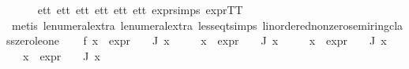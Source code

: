 \begin{isabellebody}
\ \ \ \ \isamarkupfalse%
\ e{}{\isacharunderscore}{\kern0pt}tt\ e{}{\isacharunderscore}{\kern0pt}tt\ e{}{\isacharunderscore}{\kern0pt}tt\ e{}{\isacharunderscore}{\kern0pt}tt\ e{}{\isacharunderscore}{\kern0pt}tt\ e{}{\isacharunderscore}{\kern0pt}tt\ expr{\isachardot}{\kern0pt}simps\ expr{\isacharunderscore}{\kern0pt}TT\ \isanewline
\ \ \ \ \isamarkupfalse%
\ {\isacharparenleft}{\kern0pt}metis\ le{\isacharunderscore}{\kern0pt}numeral{\isacharunderscore}{\kern0pt}extra{\isacharparenleft}{\kern0pt}{}{\isacharparenright}{\kern0pt}\ le{\isacharunderscore}{\kern0pt}numeral{\isacharunderscore}{\kern0pt}extra{\isacharparenleft}{\kern0pt}{}{\isacharparenright}{\kern0pt}\ less{\isacharunderscore}{\kern0pt}eq{\isacharunderscore}{\kern0pt}t{\isachardot}{\kern0pt}simps\ linordered{\isacharunderscore}{\kern0pt}nonzero{\isacharunderscore}{\kern0pt}semiring{\isacharunderscore}{\kern0pt}class{\isachardot}{\kern0pt}zero{\isacharunderscore}{\kern0pt}le{\isacharunderscore}{\kern0pt}one{\isacharparenright}{\kern0pt}\isanewline
\ \ \isamarkupfalse%
\ f{}{\isacharcolon}{\kern0pt}\ {\isachardoublequoteopen}{\isasymforall}x\ {\isasymin}\ {\isacharparenleft}{\kern0pt}{\isacharparenleft}{\kern0pt}expr{\isacharunderscore}{\kern0pt}{}\ {\isasymcirc}\ {\isasymPhi}{\isacharparenright}{\kern0pt}\ {\isacharbackquote}{\kern0pt}\ J{\isacharparenright}{\kern0pt}{\isachardot}{\kern0pt}\ x\ {\isasymle}\ {}{\isachardoublequoteclose}\isanewline
\ \ \ {\isachardoublequoteopen}{\isasymforall}x\ {\isasymin}\ {\isacharparenleft}{\kern0pt}{\isacharparenleft}{\kern0pt}expr{\isacharunderscore}{\kern0pt}{}\ {\isasymcirc}\ {\isasymPhi}{\isacharparenright}{\kern0pt}\ {\isacharbackquote}{\kern0pt}\ J{\isacharparenright}{\kern0pt}{\isachardot}{\kern0pt}\ x\ {\isasymle}\ {}{\isachardoublequoteclose}\isanewline
\ \ \ {\isachardoublequoteopen}{\isasymforall}x\ {\isasymin}\ {\isacharparenleft}{\kern0pt}{\isacharparenleft}{\kern0pt}expr{\isacharunderscore}{\kern0pt}{}\ {\isasymcirc}\ {\isasymPhi}{\isacharparenright}{\kern0pt}\ {\isacharbackquote}{\kern0pt}\ J{\isacharparenright}{\kern0pt}{\isachardot}{\kern0pt}\ x\ {\isasymle}\ {}{\isachardoublequoteclose}\isanewline
\ \ \ {\isachardoublequoteopen}{\isasymforall}x\ {\isasymin}\ {\isacharparenleft}{\kern0pt}{\isacharparenleft}{\kern0pt}expr{\isacharunderscore}{\kern0pt}{}\ {\isasymcirc}\ {\isasymPhi}{\isacharparenright}{\kern0pt}\ {\isacharbackquote}{\kern0pt}\ J{\isacharparenright}{\kern0pt}{\isachardot}{\kern0pt}\ x\ {\isasymle}\ {}{\isachardoublequoteclose}\isanewline

\end{isabellebody}
